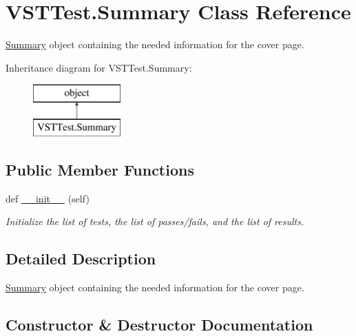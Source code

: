 \hypertarget{class_v_s_t_test_1_1_summary}{}\section{V\+S\+T\+Test.\+Summary Class Reference}
\label{class_v_s_t_test_1_1_summary}


\hyperlink{class_v_s_t_test_1_1_summary}{Summary} object containing the needed information for the cover page.  


Inheritance diagram for V\+S\+T\+Test.\+Summary\+:\begin{figure}[H]
\begin{center}
\leavevmode
\includegraphics[height=2.000000cm]{class_v_s_t_test_1_1_summary}
\end{center}
\end{figure}
\subsection*{Public Member Functions}
\begin{DoxyCompactItemize}
\item 
def \hyperlink{class_v_s_t_test_1_1_summary_ad86d56416c316e7b4029924b457b6cbe}{\+\_\+\+\_\+init\+\_\+\+\_\+} (self)
\begin{DoxyCompactList}\small\item\em Initialize the list of tests, the list of passes/fails, and the list of results. \end{DoxyCompactList}\end{DoxyCompactItemize}


\subsection{Detailed Description}
\hyperlink{class_v_s_t_test_1_1_summary}{Summary} object containing the needed information for the cover page. 



\subsection{Constructor \& Destructor Documentation}
